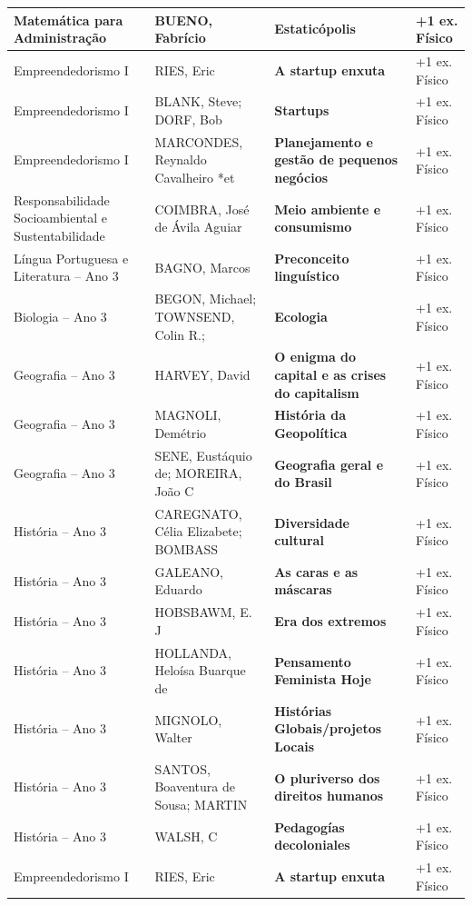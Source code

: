 \documentclass[10pt,a4paper]{article}
\begin{document}
\begin{xltabular}{\linewidth}{|p{3.8cm}|p{3.2cm}|X|p{2.2cm}|}
Matemática para Administração & BUENO, Fabrício & \textbf{Estaticópolis} & +1 ex. Físico \\ \hline
Empreendedorismo I & RIES, Eric & \textbf{A startup enxuta} & +1 ex. Físico \\ \hline
Empreendedorismo I & BLANK, Steve; DORF, Bob & \textbf{Startups} & +1 ex. Físico \\ \hline
Empreendedorismo I & MARCONDES, Reynaldo Cavalheiro *et & \textbf{Planejamento e gestão de pequenos negócios} & +1 ex. Físico \\ \hline
Responsabilidade Socioambiental e Sustentabilidade & COIMBRA, José de Ávila Aguiar & \textbf{Meio ambiente e consumismo} & +1 ex. Físico \\ \hline
Língua Portuguesa e Literatura -- Ano 3 & BAGNO, Marcos & \textbf{Preconceito linguístico} & +1 ex. Físico \\ \hline
Biologia -- Ano 3 & BEGON, Michael; TOWNSEND, Colin R.; & \textbf{Ecologia} & +1 ex. Físico \\ \hline
Geografia -- Ano 3 & HARVEY, David & \textbf{O enigma do capital e as crises do capitalism} & +1 ex. Físico \\ \hline
Geografia -- Ano 3 & MAGNOLI, Demétrio & \textbf{História da Geopolítica} & +1 ex. Físico \\ \hline
Geografia -- Ano 3 & SENE, Eustáquio de; MOREIRA, João C & \textbf{Geografia geral e do Brasil} & +1 ex. Físico \\ \hline
História -- Ano 3 & CAREGNATO, Célia Elizabete; BOMBASS & \textbf{Diversidade cultural} & +1 ex. Físico \\ \hline
História -- Ano 3 & GALEANO, Eduardo & \textbf{As caras e as máscaras} & +1 ex. Físico \\ \hline
História -- Ano 3 & HOBSBAWM, E. J & \textbf{Era dos extremos} & +1 ex. Físico \\ \hline
História -- Ano 3 & HOLLANDA, Heloísa Buarque de & \textbf{Pensamento Feminista Hoje} & +1 ex. Físico \\ \hline
História -- Ano 3 & MIGNOLO, Walter & \textbf{Histórias Globais/projetos Locais} & +1 ex. Físico \\ \hline
História -- Ano 3 & SANTOS, Boaventura de Sousa; MARTIN & \textbf{O pluriverso dos direitos humanos} & +1 ex. Físico \\ \hline
História -- Ano 3 & WALSH, C & \textbf{Pedagogías decoloniales} & +1 ex. Físico \\ \hline
Empreendedorismo I & RIES, Eric & \textbf{A startup enxuta} & +1 ex. Físico \\ \hline

\end{xltabular}
\end{document}
